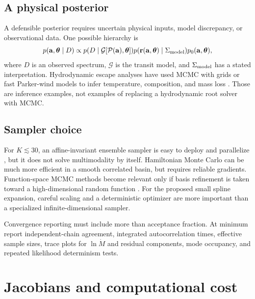 \documentclass[english,a4paper]{my_memo}
\newcommand{\vect}[1]{\mathbf{#1}}
\newcommand{\coef}{\vect{a}}
\newcommand{\mdot}{\dot M}
\begin{document}
\subsection{A physical posterior}

A defensible posterior requires uncertain physical inputs, model discrepancy,
or observational data.  One possible hierarchy is
\begin{equation}
 p(\coef,\boldsymbol{\theta}\mid D)\propto
 p(D\mid\mathcal{G}[\mathcal{P}(\coef),\boldsymbol{\theta}])
 p(\vect{r}(\coef,\boldsymbol{\theta})\mid\Sigma_{\rm model})
 p_0(\coef,\boldsymbol{\theta}),
 \label{eq:physicalposterior}
\end{equation}
where \(D\) is an observed spectrum, \(\mathcal{G}\) is the transit model, and
\(\Sigma_{\rm model}\) has a stated interpretation.  Hydrodynamic escape
analyses have used MCMC with grids or fast Parker-wind models to infer
temperature, composition, and mass loss \cite{Lampon2021,DosSantos2022}.
Those are inference examples, not examples of replacing a hydrodynamic root
solver with MCMC.

\subsection{Sampler choice}

For \(K\lesssim30\), an affine-invariant ensemble sampler is easy to deploy and
parallelize \cite{Goodman2010}, but it does not solve multimodality by itself.
Hamiltonian Monte Carlo can be much more efficient in a smooth correlated basin,
but requires reliable gradients.  Function-space MCMC methods become relevant
only if basis refinement is taken toward a high-dimensional random function
\cite{Cotter2013}.  For the proposed small spline expansion, careful scaling
and a deterministic optimizer are more important than a specialized
infinite-dimensional sampler.

Convergence reporting must include more than acceptance fraction.  At minimum
report independent-chain agreement, integrated autocorrelation times, effective
sample sizes, trace plots for \(\ln\mdot\) and residual components, mode
occupancy, and repeated likelihood determinism tests.

\section{Jacobians and computational cost}\label{sec:jacobian}
\end{document}

